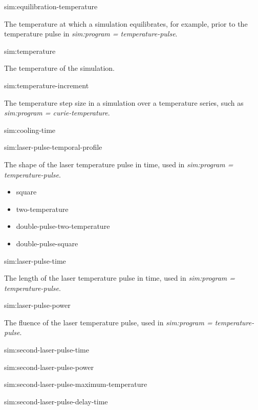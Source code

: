 {\zicf sim:equilibration-temperature} The temperature at which a simulation equilibrates, for example, prior to the temperature pulse in \textit{sim:program = temperature-pulse}.

{\zicf sim:temperature} The temperature of the simulation.

{\zicf sim:temperature-increment} The temperature step size in a simulation over a temperature series, such as \textit{sim:program = curie-temperature}.

{\zicf sim:cooling-time}

{\zicf sim:laser-pulse-temporal-profile} The shape of the laser temperature pulse in time, used in \textit{sim:program = temperature-pulse}.

\begin{itemize}
   \item[] square
   \item[] two-temperature
   \item[] double-pulse-two-temperature
   \item[] double-pulse-square
\end{itemize}

{\zicf sim:laser-pulse-time} The length of the laser temperature pulse in time, used in \textit{sim:program = temperature-pulse}.

{\zicf sim:laser-pulse-power} The fluence of the laser temperature pulse, used in \textit{sim:program = temperature-pulse}.

{\zicf sim:second-laser-pulse-time}

{\zicf sim:second-laser-pulse-power}

{\zicf sim:second-laser-pulse-maximum-temperature}

{\zicf sim:second-laser-pulse-delay-time}


